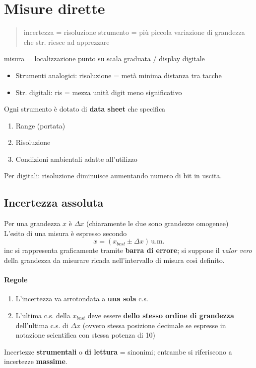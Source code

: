 \documentclass[10pt, oneside]{book}
\begin{document}
\section{Misure dirette}
\begin{quote}
incertezza = risoluzione strumento = più piccola variazione di grandezza che str. riesce ad apprezzare
\end{quote}
misura = localizzazione punto su scala graduata / display digitale
\begin{itemize}
\item Strumenti analogici: risoluzione = metà minima distanza tra tacche
\item Str. digitali: ris = mezza unità digit meno significativo
\end{itemize}
Ogni strumento è dotato di \textbf{data sheet} che specifica
\begin{enumerate}
\item Range (portata)
\item Risoluzione 
\item Condizioni ambientali adatte all'utilizzo
\end{enumerate}
Per digitali: risoluzione diminuisce aumentando numero di bit in uscita.

\subsection{Incertezza assoluta}
Per una grandezza $x$ è $\Delta x$ (chiaramente le due sono grandezze omogenee)\\
L'esito di una misura è espresso secondo
\[x = (x_{best} \pm \Delta x) \, \mathrm{u.m.}\]
inc si rappresenta graficamente tramite \textbf{barra di errore}; si suppone il \textit{valor vero} della grandezza da misurare ricada nell'intervallo di misura così definito.
\paragraph{Regole}
\begin{enumerate}
\item L'incertezza va arrotondata a \textbf{una sola} c.s.
\item L'ultima c.s. della $x_{best}$ deve essere \textbf{dello stesso ordine di grandezza} dell'ultima c.s. di $\Delta x$ (ovvero stessa posizione decimale se espresse in notazione scientifica con stessa potenza di 10)
\end{enumerate}
Incertezze \textbf{strumentali} o \textbf{di lettura} = sinonimi; entrambe si riferiscono a incertezze \textbf{massime}.
\end{document}
